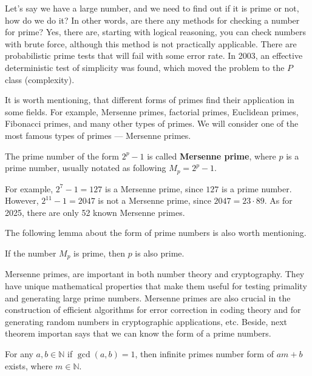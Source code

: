 \documentclass[../lecture-notes-148x210.tex]{subfiles}
\begin{document}
Let's say we have a large number, and we need to find out if it is prime or not, 
how do we do it? In other words, are there any methods for checking a number for prime?
Yes, there are, starting with logical reasoning, you can check numbers with brute force, although
this method is not practically applicable. There are probabilistic prime tests that will fail
with some error rate. In 2003, an effective deterministic test of simplicity was found, which moved
the problem to the $P$ class (complexity).

It is worth mentioning, that different forms of primes find their application in some 
fields. For example, Mersenne primes, factorial primes, Euclidean primes, Fibonacci primes,
and many other types of primes. We will consider one of the most famous types of 
primes --- Mersenne primes.

\begin{definition} 
    The prime number of the form $2^p - 1$ is called \textbf{Mersenne prime}, where $p$ is a
    prime number, usually notated as following $M_p = 2^p - 1$.
\end{definition}

\begin{example}
    For example, $2^7 - 1 = 127$ is a Mersenne prime, since $127$ is a prime number.
    However, $2^{11} - 1 = 2047$ is not a Mersenne prime, since $2047 = 23 \cdot 89$. 
    As for 2025, there are only 52 known Mersenne primes.
\end{example}

The following lemma about the form of prime numbers 
is also worth mentioning. 

\begin{lemma}
    If the number $M_p$ is prime, then $p$ is also prime.
\end{lemma}

Mersenne primes, are important in both number theory and cryptography.
They have unique mathematical properties that make them useful for testing primality and generating large prime numbers.
Mersenne primes are also crucial in the construction of efficient algorithms for error correction in coding theory and for generating random numbers in cryptographic applications, etc. 
Beside, next theorem importan says that we can know the form of a prime numbers.

\begin{theorem} 
    For any $a, b \in \mathbb{N}$ if $\gcd(a, b) = 1$, then infinite primes number form of $am + b$ exists, where $m \in \mathbb{N}$.
\end{theorem}
\end{document}

